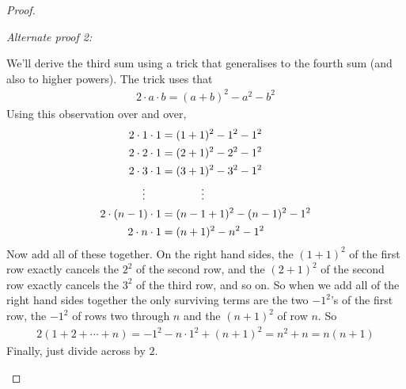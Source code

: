 \begin{proof}
\begin{enumerate}[(a)]
{\noindent \emph{Alternate proof 2:}

We'll derive the third sum using a trick that generalises to the
fourth sum (and also to higher powers). The trick uses that
\begin{align*}
2\cdot a\cdot b=(a+b)^2-a^2-b^2
\end{align*}
Using this observation over and over,
\begin{align*}
2\cdot 1\cdot 1 &= (1+1)^2-1^2-1^2 \\
2\cdot 2\cdot 1 &= (2+1)^2-2^2-1^2 \\
2\cdot 3\cdot 1 &= (3+1)^2-3^2-1^2 \\
\vdots\hskip0.2in & \hskip0.5in\vdots \\
2\cdot (n-1)\cdot 1 &= (n-1+1)^2-(n-1)^2-1^2 \\
2\cdot n\cdot 1 &= (n+1)^2-n^2-1^2
\end{align*}
Now add all of these together. On the right hand sides, the $(1+1)^2$ of
the first row exactly cancels the $2^2$ of the second row, and the $(2+1)^2$
of the second row exactly cancels the $3^2$ of the third row, and so on.
So when we add all of the right hand sides together the only surviving
terms are the two $-1^2$'s of the first row, the $-1^2$ of rows two through
$n$ and the $(n+1)^2$ of row $n$. So
\begin{align*}
2(1+2+\cdots+n)=-1^2-n\cdot 1^2+(n+1)^2=n^2+n=n(n+1)
\end{align*}
Finally, just divide across by $2$.

}
\end{enumerate}
\end{proof}
